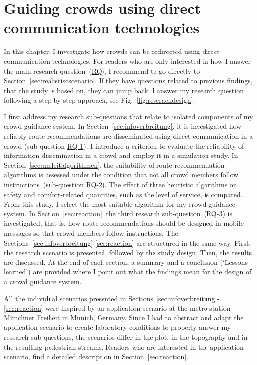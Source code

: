
\chapter{Guiding crowds using direct communication technologies}
\label{sec:investigation}




In this chapter, I investigate how crowds can be redirected using direct communication technologies. For readers who are only interested in how I answer the main research question~(\hyperref[reserachquestions]{RQ}), I recommend to go directly to Section~\ref{sec:realistiscscenario}. If they have questions related to previous findings, that the study is based on, they can jump back. I answer my  research question following a step-by-step approach, see Fig.~\ref{fig:reserachdesign}. 


I first address my research sub-questions that relate to isolated components of my crowd guidance system. In Section~\ref{sec:infoverbreitung}, it is investigated how reliably route recommendations are disseminated using direct communication in a crowd (sub-question \hyperref[reserachquestions]{RQ-1}). I introduce a criterion to evaluate the reliability of information dissemination in a crowd and employ it in a simulation study.  In Section~\ref{sec:umleitalgorithmen}, the suitability of route recommendation algorithms is assessed under the condition that not all crowd members follow instructions~(sub-question \hyperref[reserachquestions]{RQ-2}). The effect of three heuristic algorithms on safety and comfort-related quantities, such as the level of service, is compared. From this study, I select the most suitable algorithm for my crowd guidance system. In Section~\ref{sec:reaction}, the third research sub-question~(\hyperref[reserachquestions]{RQ-3}) is investigated, that is,
how route recommendations should be designed in mobile messages so that crowd members follow instructions. 
The Sections~\ref{sec:infoverbreitung}-\ref{sec:reaction} are structured in the same way. First, the research scenario is presented, followed by the study design. Then, the results are discussed.  At the end of each section, a summary and a conclusion (`Lessons learned') are provided where I point out what the findings mean for the design of a crowd guidance system.

All the individual scenarios presented in Sections~\ref{sec:infoverbreitung}-\ref{sec:reaction} were inspired by an application scenario at the metro station Münchner Freiheit in Munich, Germany. Since I had to abstract and adapt the application scenario to create laboratory conditions to properly answer my research sub-questions, the scenarios differ in the plot, in the topography and in the resulting pedestrian streams. 
Readers who are interested in the application scenario,  find a detailed description in  Section~\ref{sec:reaction}.


